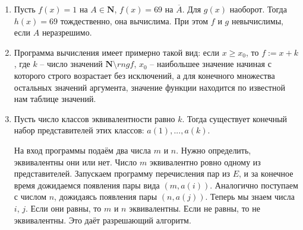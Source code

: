 \documentclass[11pt]{article}
\begin{document}
\begin{enumerate}
		\item Пусть $f(x)=1$ на $A\in \mathbf{N}$, $f(x)=69$ на $\overline{A}$. Для $g(x)$ наоборот. Тогда $h(x)=69$ тождественно, она вычислима. При этом $f$ и $g$ невычислимы, если $A$ неразрешимо.
		
		\item Программа вычисления имеет примерно такой вид: если $x\ge x_0$, то $f:=x+k$, где $k$ -- число значений $\mathbf{N} \setminus rng f$, $x_0$ -- наибольшее значение начиная с которого строго возрастает без исключений, а для конечного множества остальных значений аргумента, значение функции находится по известной нам таблице значений.
		
		\item Пусть число классов эквивалентности равно $k$. Тогда существует конечный набор представителей этих классов: $a(1), ... , a(k)$.
		
		На вход программы подаём два числа $m$ и $n$. Нужно определить, эквивалентны они или нет. Число $m$ эквивалентно ровно одному из представителей. Запускаем программу перечисления пар из $E$, и за конечное время дожидаемся появления пары вида $(m,a(i))$. Аналогично поступаем с числом $n$, дожидаясь появления пары $(n,a(j))$. Теперь мы знаем числа $i$, $j$. Если они равны, то $m$ и $n$ эквивалентны. Если не равны, то не эквивалентны. Это даёт разрешающий алгоритм.
		
		
		
	\end{enumerate}
\end{document}
